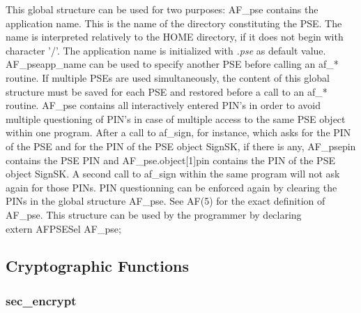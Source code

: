 This global structure can be used for two purposes:
\be
\m AF\_pse contains the application name. This is the
   name of the directory constituting the PSE. The name is interpreted 
   relatively to the HOME directory, if it does not begin with character '/'.
   The application name is initialized with {\em .pse} as default value.
   AF\_pse\pf app\_name can be used to specify another PSE before calling
   an af\_* routine. If multiple PSEs are used simultaneously, the content
   of this global structure must be saved for each PSE and restored
   before a call to an af\_* routine.
\m AF\_pse contains all interactively entered PIN's in order to avoid multiple
   questioning of PIN's in case of multiple access to the same PSE object within
   one program. After a call to af\_sign, for instance, which asks for the PIN
   of the PSE and for the PIN of the PSE object SignSK, if there is any,
   AF\_pse\pf pin contains the PSE PIN and AF\_pse.object[1]\pf pin contains the
   PIN of the PSE object SignSK. A second call to af\_sign within the same
   program will not ask again for those PINs. PIN questionning can be
   enforced again by clearing the PINs in the global structure AF\_pse.
   See AF(5) for the exact definition of AF\_pse.
\ee
This structure can be used by the programmer by declaring \\

{\small
extern AFPSESel AF\_pse;
}
\subsection{Cryptographic Functions}
\subsubsection{sec\_encrypt}
